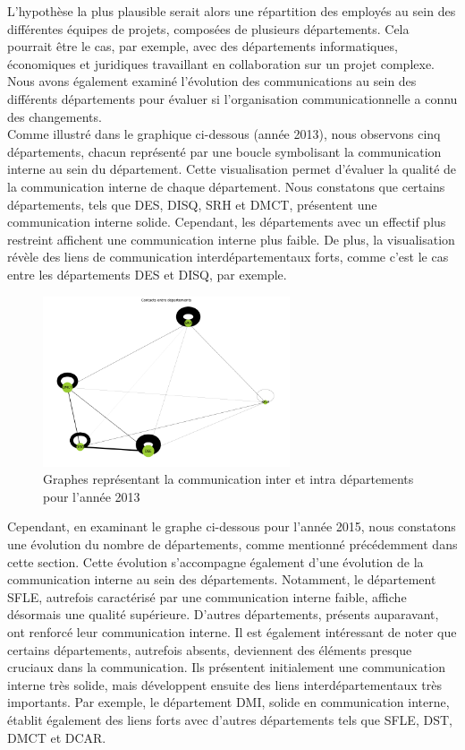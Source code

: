 \documentclass{article}
\begin{document}
L'hypothèse la plus plausible serait alors une répartition des employés au sein des différentes équipes de projets, composées de plusieurs départements. Cela pourrait être le cas, par exemple, avec des départements informatiques, économiques et juridiques travaillant en collaboration sur un projet complexe. \\

Nous avons également examiné l'évolution des communications au sein des différents départements pour évaluer si l'organisation communicationnelle a connu des changements. \\

Comme illustré dans le graphique ci-dessous (année 2013), nous observons cinq départements, chacun représenté par une boucle symbolisant la communication interne au sein du département. Cette visualisation permet d'évaluer la qualité de la communication interne de chaque département. Nous constatons que certains départements, tels que DES, DISQ, SRH et DMCT, présentent une communication interne solide. Cependant, les départements avec un effectif plus restreint affichent une communication interne plus faible. De plus, la visualisation révèle des liens de communication interdépartementaux forts, comme c'est le cas entre les départements DES et DISQ, par exemple.

\begin{figure}[!h]
    \centering
    \includegraphics[width=0.65\textwidth]{assets/communaute/communaute_communication_2013.png}
    \caption{Graphes représentant la communication inter et intra départements pour l'année 2013}
    \label{fig:communaute_communication_2013}
\end{figure}

Cependant, en examinant le graphe ci-dessous pour l'année 2015, nous constatons une évolution du nombre de départements, comme mentionné précédemment dans cette section. Cette évolution s'accompagne également d'une évolution de la communication interne au sein des départements. Notamment, le département SFLE, autrefois caractérisé par une communication interne faible, affiche désormais une qualité supérieure. D'autres départements, présents auparavant, ont renforcé leur communication interne. Il est également intéressant de noter que certains départements, autrefois absents, deviennent des éléments presque cruciaux dans la communication. Ils présentent initialement une communication interne très solide, mais développent ensuite des liens interdépartementaux très importants. Par exemple, le département DMI, solide en communication interne, établit également des liens forts avec d'autres départements tels que SFLE, DST, DMCT et DCAR.
\end{document}
